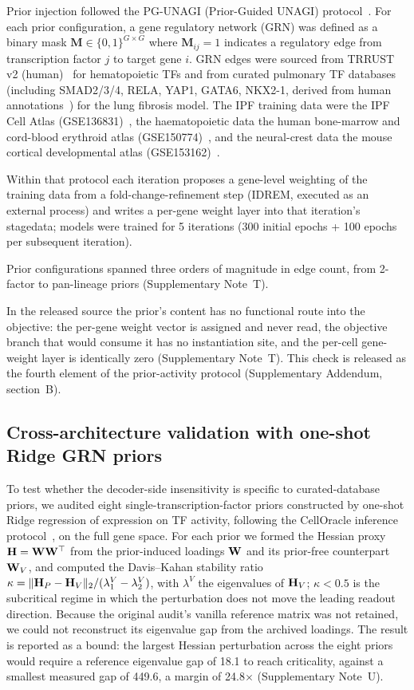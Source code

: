 Prior injection followed the PG-UNAGI (Prior-Guided UNAGI) protocol~\cite{unagi}. For each prior configuration, a gene regulatory network (GRN) was defined as a binary mask $\mathbf{M} \in \{0,1\}^{G \times G}$ where $\mathbf{M}_{ij}=1$ indicates a regulatory edge from transcription factor $j$ to target gene $i$. GRN edges were sourced from TRRUST v2 (human)~\cite{han2018} for hematopoietic TFs and from curated pulmonary TF databases (including SMAD2/3/4, RELA, YAP1, GATA6, NKX2-1, derived from human annotations~\cite{li2023mmp}) for the lung fibrosis model. The IPF training data were the IPF Cell Atlas (GSE136831)~\cite{adams2020}, the haematopoietic data the human bone-marrow and cord-blood erythroid atlas (GSE150774)~\cite{huang2020}, and the neural-crest data the mouse cortical developmental atlas (GSE153162)~\cite{dibella2021}.

Within that protocol each iteration proposes a gene-level weighting of the training data from a fold-change-refinement step (IDREM, executed as an external process) and writes a per-gene weight layer into that iteration's stagedata; models were trained for 5 iterations (300 initial epochs + 100 epochs per subsequent iteration).

Prior configurations spanned three orders of magnitude in edge count, from 2-factor to pan-lineage priors (Supplementary Note~T).

In the released source the prior's content has no functional route into the objective: the per-gene weight vector is assigned and never read, the objective branch that would consume it has no instantiation site, and the per-cell gene-weight layer is identically zero (Supplementary Note~T). This check is released as the fourth element of the prior-activity protocol (Supplementary Addendum, section~B).

\subsection*{Cross-architecture validation with one-shot Ridge GRN priors}

To test whether the decoder-side insensitivity is specific to curated-database priors, we audited eight single-transcription-factor priors constructed by one-shot Ridge regression of expression on TF activity, following the CellOracle inference protocol~\cite{kamimoto2023}, on the full gene space. For each prior we formed the Hessian proxy $\mathbf{H}=\mathbf{W}\mathbf{W}^\top$ from the prior-induced loadings $\mathbf{W}$ and its prior-free counterpart $\mathbf{W}_V$, and computed the Davis--Kahan stability ratio $\kappa=\|\mathbf{H}_P-\mathbf{H}_V\|_2/(\lambda_1^V-\lambda_2^V)$, with $\lambda^V$ the eigenvalues of $\mathbf{H}_V$; $\kappa<0.5$ is the subcritical regime in which the perturbation does not move the leading readout direction. Because the original audit's vanilla reference matrix was not retained, we could not reconstruct its eigenvalue gap from the archived loadings. The result is reported as a bound: the largest Hessian perturbation across the eight priors would require a reference eigenvalue gap of 18.1 to reach criticality, against a smallest measured gap of 449.6, a margin of 24.8$\times$ (Supplementary Note~U).

